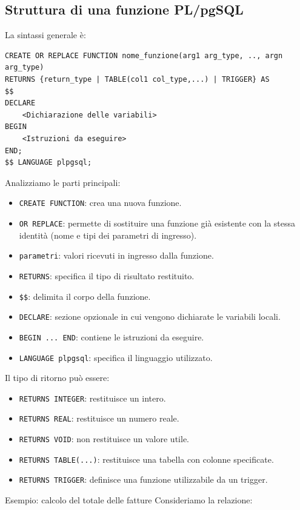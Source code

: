 \subsection{Struttura di una funzione PL/pgSQL}
La sintassi generale è:
\begin{verbatim}
CREATE OR REPLACE FUNCTION nome_funzione(arg1 arg_type, .., argn arg_type)
RETURNS {return_type | TABLE(col1 col_type,...) | TRIGGER} AS
$$
DECLARE
    <Dichiarazione delle variabili>
BEGIN
    <Istruzioni da eseguire>
END;
$$ LANGUAGE plpgsql;
\end{verbatim}
Analizziamo le parti principali:
\begin{itemize}
    \item \texttt{CREATE FUNCTION}: crea una nuova funzione.
    \item \texttt{OR REPLACE}: permette di sostituire
    una funzione già esistente con la stessa
    identità (nome e tipi dei parametri di ingresso).
    \item \texttt{parametri}: valori ricevuti
    in ingresso dalla funzione.
    \item \texttt{RETURNS}: specifica il tipo
    di risultato restituito.
    \item \texttt{\$\$}: delimita il corpo della funzione.
    \item \texttt{DECLARE}: sezione opzionale
    in cui vengono dichiarate le variabili locali.
    \item \texttt{BEGIN ... END}: contiene
    le istruzioni da eseguire.
    \item \texttt{LANGUAGE plpgsql}: specifica
    il linguaggio utilizzato.
\end{itemize}

Il tipo di ritorno può essere:
\begin{itemize}
    \item \texttt{RETURNS INTEGER}: restituisce un intero.
    \item \texttt{RETURNS REAL}: restituisce un numero reale.
    \item \texttt{RETURNS VOID}: non restituisce
    un valore utile.
    \item \texttt{RETURNS TABLE(...)}: restituisce
    una tabella con colonne specificate.
    \item \texttt{RETURNS TRIGGER}: definisce
    una funzione utilizzabile da un trigger.
\end{itemize}
\textcolor{verdeEsempio}{Esempio:} calcolo del totale delle fatture
Consideriamo la relazione:

